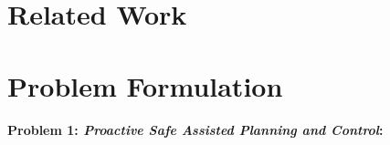 \documentclass[conference]{IEEEtran}
\begin{document}
    

\section{Related Work}

    
    
    
    
    
\section{Problem Formulation}
 
\textbf{Problem 1: \textit{Proactive Safe Assisted Planning and Control}:} 
    
\end{document}
